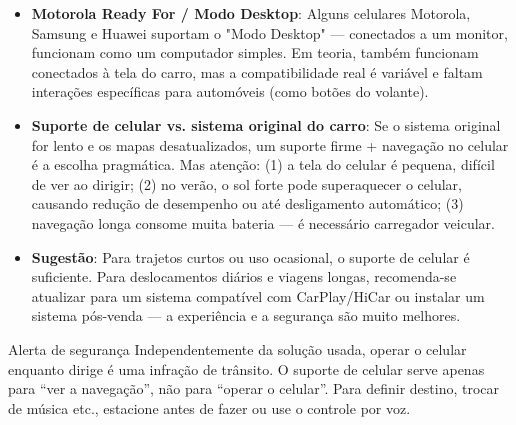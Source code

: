 \begin{itemize}
  \item \textbf{Motorola Ready For / Modo Desktop}: Alguns celulares Motorola, Samsung e Huawei suportam o "Modo Desktop" — conectados a um monitor, funcionam como um computador simples. Em teoria, também funcionam conectados à tela do carro, mas a compatibilidade real é variável e faltam interações específicas para automóveis (como botões do volante).
  \item \textbf{Suporte de celular vs. sistema original do carro}: Se o sistema original for lento e os mapas desatualizados, um suporte firme + navegação no celular é a escolha pragmática. Mas atenção: (1) a tela do celular é pequena, difícil de ver ao dirigir; (2) no verão, o sol forte pode superaquecer o celular, causando redução de desempenho ou até desligamento automático; (3) navegação longa consome muita bateria — é necessário carregador veicular.
  \item \textbf{Sugestão}: Para trajetos curtos ou uso ocasional, o suporte de celular é suficiente. Para deslocamentos diários e viagens longas, recomenda-se atualizar para um sistema compatível com CarPlay/HiCar ou instalar um sistema pós-venda — a experiência e a segurança são muito melhores.
\end{itemize}

\begin{tcbwarn}{Alerta de segurança}
Independentemente da solução usada, operar o celular enquanto dirige é uma infração de trânsito. O suporte de celular serve apenas para “ver a navegação”, não para “operar o celular”. Para definir destino, trocar de música etc., estacione antes de fazer ou use o controle por voz.

\end{tcbwarn}


